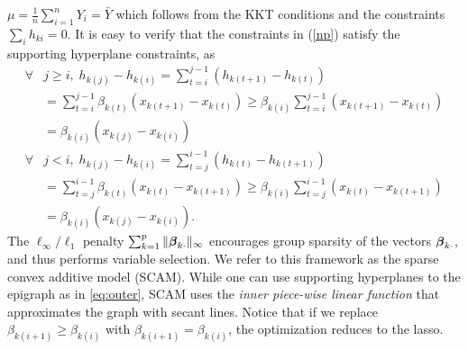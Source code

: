 $\mu = \frac{1}{n} \sum_{i=1}^n Y_i = \bar{Y}$ which follows from the
KKT conditions
and the constraints $\sum_i h_{ki} = 0$.
It is easy to verify that the constraints in (\ref{np}) satisfy the supporting hyperplane constraints, as
\begin{align*}
  \forall & j\geq{}i, \; h_{k(j)}-h_{k(i)}  = 
            \sum\limits_{t=i}^{j-1}(h_{k(t+1)}-h_{k(t)}) \\
      & = \sum\limits_{t=i}^{j-1}\beta_{k(t)}(x_{k(t+1)}-x_{k(t)})
       \geq \beta_{k(i)}\sum\limits_{t=i}^{j-1}(x_{k(t+1)}-x_{k(t)}) \\
      & = \beta_{k(i)}(x_{k(j)}-x_{k(i)}) \\
  \forall & j<i,\;  h_{k(j)}-h_{k(i)} =
                \sum\limits_{t=j}^{i-1}(h_{k(t)}-h_{k(t+1)}) \\
     & = \sum\limits_{t=j}^{i-1}\beta_{k(t)}(x_{k(t)}-x_{k(t+1)}) 
     \geq \beta_{k(i)}\sum\limits_{t=j}^{i-1}(x_{k(t)}-x_{k(t+1)})  \\
     &= \beta_{k(i)}(x_{k(j)}-x_{k(i)}).
\end{align*}
The $\ell_\infty/\ell_1$ penalty
$\sum_{k=1}^{p}\|\boldsymbol{\beta}_{k\cdot}\|_{\infty}$ encourages group
sparsity of the vectors $\boldsymbol{\beta}_{k\cdot}$, and thus performs
variable selection.  We refer to this framework as the sparse convex
additive model (SCAM). While one can use
supporting hyperplanes to the epigraph as in \eqref{eq:outer}, 
SCAM uses the \emph{inner  piece-wise linear function}
that approximates the graph with secant lines. Notice that if we replace $\beta_{k(i+1)} \geq
\beta_{k(i)}$ with $\beta_{k(i+1)}=\beta_{k(i)}$, the optimization
reduces to the lasso.  



